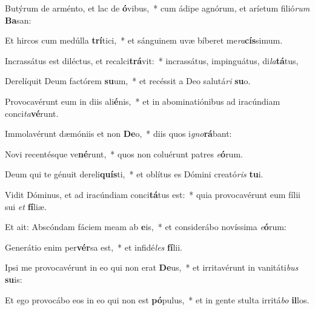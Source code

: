 \item Butýrum de arménto, et lac de \textbf{ó}vibus,~* cum ádipe agnórum, et aríetum filió\textit{rum} \textbf{Ba}san:
\item Et hircos cum medúlla \textbf{trí}tici,~* et sánguinem uvæ bíberet me\textit{ra}\textbf{cís}simum.
\item Incrassátus est diléctus, et recalci\textbf{trá}vit:~* incrassátus, impinguátus, di\textit{la}\textbf{tá}tus,
\item Derelíquit Deum factórem \textbf{su}um,~* et recéssit a Deo salutá\textit{ri} \textbf{su}o.
\item Provocavérunt eum in diis ali\textbf{é}nis,~* et in abominatiónibus ad iracúndiam conci\textit{ta}\textbf{vé}runt.
\item Immolavérunt dæmóniis et non \textbf{De}o,~* diis quos i\textit{gno}\textbf{rá}bant:
\item Novi recentésque ve\textbf{né}runt,~* quos non coluérunt patres \textit{e}\textbf{ó}rum.
\item Deum qui te génuit dereli\textbf{quís}ti,~* et oblítus es Dómini creató\textit{ris} \textbf{tu}i.
\item Vidit Dóminus, et ad iracúndiam conci\textbf{tá}tus est:~* quia provocavérunt eum fílii sui \textit{et} \textbf{fí}liæ.
\item Et ait: Abscóndam fáciem meam ab \textbf{e}is,~* et considerábo novíssima \textit{e}\textbf{ó}rum:
\item Generátio enim per\textbf{vér}sa est,~* et infidé\textit{les} \textbf{fí}lii.
\item Ipsi me provocavérunt in eo qui non erat \textbf{De}us,~* et irritavérunt in vanitáti\textit{bus} \textbf{su}is:
\item Et ego provocábo eos in eo qui non est \textbf{pó}pulus,~* et in gente stulta irritá\textit{bo} \textbf{il}los.
